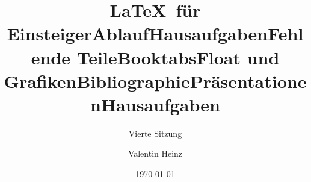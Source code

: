 \documentclass[]{beamer}
\date{}
\author{Valentin Heinz}
\title{\LaTeX \ für Einsteiger}
\subtitle{Vierte Sitzung}
\date{\today}
\begin{document}
\maketitle

\title{Ablauf}


\title{Hausaufgaben}


\title{Fehlende Teile}


\title{Booktabs}


\title{Float und Grafiken}


%

\title{Bibliographie}


\title{Präsentationen}


\title{Hausaufgaben}

\end{document}
